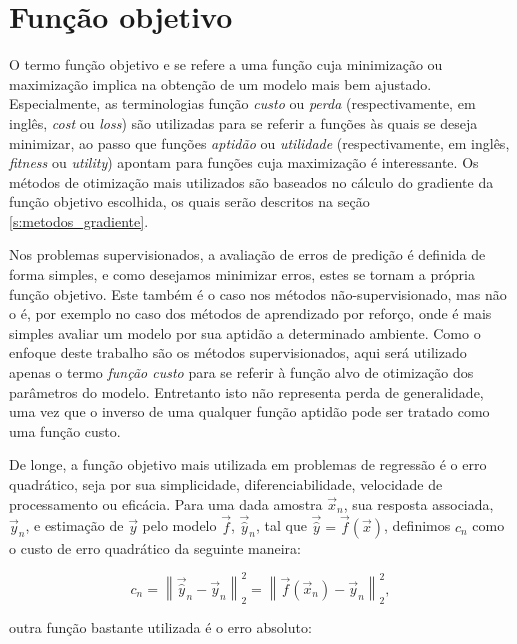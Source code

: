   \section{Função objetivo} \label{s:objetivo}

    O termo função objetivo e se refere a uma função cuja minimização ou maximização implica na obtenção de um modelo mais bem ajustado. Especialmente, as terminologias função \emph{custo} ou \emph{perda} (respectivamente, em inglês, \textit{cost} ou \textit{loss}) são utilizadas para se referir a funções às quais se deseja minimizar, ao passo que funções \emph{aptidão} ou \emph{utilidade} (respectivamente, em inglês, \textit{fitness} ou \textit{utility}) apontam para funções cuja maximização é interessante. Os métodos de otimização mais utilizados são baseados no cálculo do gradiente da função objetivo escolhida, os quais serão descritos na seção \ref{s:metodos_gradiente}. %

    Nos problemas supervisionados, a avaliação de erros de predição é definida de forma simples, e como desejamos minimizar erros, estes se tornam a própria função objetivo. Este também é o caso nos métodos não-supervisionado, mas não o é, por exemplo no caso dos métodos de aprendizado por reforço, onde é mais simples avaliar um modelo por sua aptidão a determinado ambiente. Como o enfoque deste trabalho são os métodos supervisionados, aqui será utilizado apenas o termo \emph{função custo} para se referir à função alvo de otimização dos parâmetros do modelo. Entretanto isto não representa perda de generalidade, uma vez que o inverso de uma qualquer função aptidão pode ser tratado como uma função custo.

    De longe, a função objetivo mais utilizada em problemas de regressão é o erro quadrático, seja por sua simplicidade, diferenciabilidade, velocidade de processamento ou eficácia. Para uma dada amostra $\vec{x}_n$, sua resposta associada, $\vec{y}_n$, e estimação de $\vec{y}$ pelo modelo $\vec{f}$, $\vec{\hat{y}}_n$, tal que $\vec{\hat{y}} = \vec{f}(\vec{x})$, definimos $c_n$ como o custo de erro quadrático da seguinte maneira:

    \begin{equation} \label{e:c_se_n}
      c_n =
      \left\| \vec{\hat{y}}_n - \vec{y}_n \right\|_2^2 =
      \left\| \vec{f}(\vec{x}_n) - \vec{y}_n \right\|_2^2
      ,
    \end{equation}

    \noindent outra função bastante utilizada é o erro absoluto:

